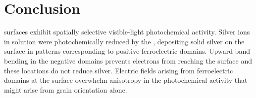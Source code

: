 \section{Conclusion}\label{sec:ch7conclusion}

 surfaces exhibit spatially selective visible-light photochemical activity. Silver ions in solution were photochemically reduced by the , depositing solid silver on the surface in patterns corresponding to positive ferroelectric domains. Upward band bending in the negative domains prevents electrons from reaching the surface and these locations do not reduce silver. Electric fields arising from ferroelectric domains at the surface overwhelm anisotropy in the photochemical activity that might arise from grain orientation alone.